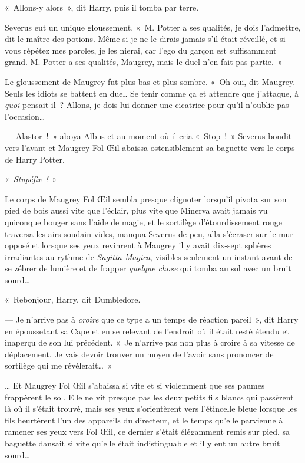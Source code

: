 «~Allons-y alors~», dit Harry, puis il tomba par terre.

Severus eut un unique gloussement.
«~M. Potter a ses qualités, je dois l'admettre, dit le maître des potions.
Même si je ne le dirais jamais s'il était réveillé, et si vous répétez mes paroles, je les nierai, car l'ego du garçon est suffisamment grand.
M. Potter a ses qualités, Maugrey, mais le duel n'en fait pas partie.~»

Le gloussement de Maugrey fut plus bas et plus sombre.
«~Oh oui, dit Maugrey.
Seuls les idiots se battent en duel.
Se tenir comme ça et attendre que j'attaque, à \emph{quoi} pensait-il~?
Allons, je dois lui donner une cicatrice pour qu'il n'oublie pas l'occasion…

--- Alastor~!~»
aboya Albus et au moment où il cria «~Stop~!~»
Severus bondit vers l'avant et Maugrey Fol Œil abaissa ostensiblement sa baguette vers le corps de Harry Potter.

«~\emph{Stupéfix~!}~»

Le corps de Maugrey Fol Œil sembla presque clignoter lorsqu'il pivota sur son pied de bois aussi vite que l'éclair, plus vite que Minerva avait jamais vu quiconque bouger sans l'aide de magie, et le sortilège d'étourdissement rouge traversa les airs soudain vides, manqua Severus de peu, alla s'écraser sur le mur opposé et lorsque ses yeux revinrent à Maugrey il y avait dix-sept sphères irradiantes au rythme de \emph{Sagitta Magica}, visibles seulement un instant avant de se zébrer de lumière et de frapper \emph{quelque chose} qui tomba au sol avec un bruit sourd…

\later

«~Rebonjour, Harry, dit Dumbledore.

--- Je n'arrive pas à \emph{croire} que ce type a un temps de réaction pareil~», dit Harry en époussetant sa Cape et en se relevant de l'endroit où il était resté étendu et inaperçu de son lui précédent.
«~Je n'arrive pas non plus à croire à sa vitesse de déplacement.
Je vais devoir trouver un moyen de l'avoir sans prononcer de sortilège qui me révélerait…~»

\later

… Et Maugrey Fol Œil s'abaissa si vite et si violemment que ses paumes frappèrent le sol.
Elle ne vit presque pas les deux petits fils blancs qui passèrent là où il s'était trouvé, mais ses yeux s'orientèrent vers l'étincelle bleue lorsque les fils heurtèrent l'un des appareils du directeur, et le temps qu'elle parvienne à ramener ses yeux vers Fol Œil, ce dernier s'était élégamment remis sur pied, sa baguette dansait si vite qu'elle était indistinguable et il y eut un autre bruit sourd…

